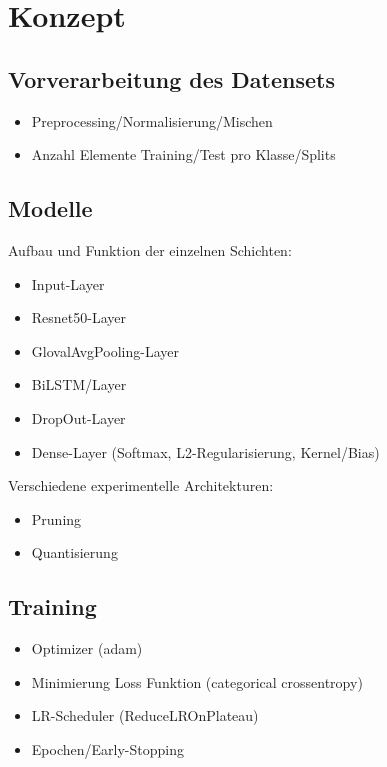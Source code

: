 \documentclass{article}
\begin{document}
    \newpage
    \section{Konzept}
    \subsection{Vorverarbeitung des Datensets}
    \begin{itemize}
        \item Preprocessing/Normalisierung/Mischen
        \item Anzahl Elemente Training/Test pro Klasse/Splits
    \end{itemize}
    \subsection{Modelle}
    Aufbau und Funktion der einzelnen Schichten:
    \begin{itemize}
        \item Input-Layer
        \item Resnet50-Layer
        \item GlovalAvgPooling-Layer
        \item BiLSTM/Layer
        \item DropOut-Layer
        \item Dense-Layer (Softmax, L2-Regularisierung, Kernel/Bias)
    \end{itemize}
    Verschiedene experimentelle Architekturen:
    \begin{itemize}
        \item Pruning %
        \item Quantisierung %
    \end{itemize}
    \subsection{Training}
    \begin{itemize}
        \item Optimizer (adam)
        \item Minimierung Loss Funktion (categorical crossentropy)
        \item LR-Scheduler (ReduceLROnPlateau)
        \item Epochen/Early-Stopping
    \end{itemize}
\end{document}
